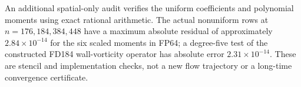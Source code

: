 An additional spatial-only audit verifies the uniform coefficients and polynomial moments using exact rational arithmetic. The actual nonuniform rows at $n=176,184,384,448$ have a maximum absolute residual of approximately $2.84\times10^{-14}$ for the six scaled moments in FP64; a degree-five test of the constructed FD184 wall-vorticity operator has absolute error $2.31\times10^{-14}$. These are stencil and implementation checks, not a new flow trajectory or a long-time convergence certificate.
